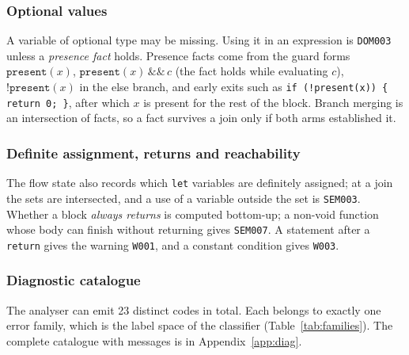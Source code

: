 \documentclass[conference]{IEEEtran}
\newcommand{\code}[1]{\texttt{#1}}
\begin{document}
\subsubsection{Optional values}

A variable of optional type may be missing. Using it in an expression is \code{DOM003} unless a \emph{presence fact}
holds. Presence facts come from the guard forms $\texttt{present}(x)$, $\texttt{present}(x)\,\&\&\,c$ (the fact holds
while evaluating $c$), $\texttt{!present}(x)$ in the else branch, and early exits such as
\code{if (!present(x)) \{ return 0; \}}, after which $x$ is present for the rest of the block. Branch merging is an
intersection of facts, so a fact survives a join only if both arms established it.

\subsubsection{Definite assignment, returns and reachability}

The flow state also records which \code{let} variables are definitely assigned; at a join the sets are intersected, and a
use of a variable outside the set is \code{SEM003}. Whether a block \emph{always returns} is computed bottom-up; a
non-void function whose body can finish without returning gives \code{SEM007}. A statement after a
\code{return} gives the warning \code{W001}, and a constant condition gives \code{W003}.

\subsubsection{Diagnostic catalogue}

The analyser can emit 23 distinct codes in total. Each belongs to exactly one error family, which is the label
space of the classifier (Table~\ref{tab:families}). The complete catalogue with messages is in Appendix~\ref{app:diag}.
\end{document}
